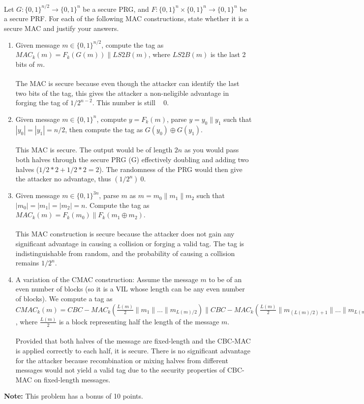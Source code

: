 \documentclass[12pt]{article}
\newcommand{\zo}{\{0,1\}}
\newcommand*\concat{\mathbin{\|}}
\begin{document}
\vspace{12pt}
Let $G:\zo^{n/2} \to \zo^{n}$ be a secure PRG, and $F:\zo^n \times \zo^n \to \zo^n$ be a secure PRF. For each of the following MAC constructions, state whether it is a secure MAC and justify your answers.
\begin{enumerate}
\item Given message $m \in \zo^{n/2}$, compute the tag as $MAC_k(m) = F_k(G(m)) \concat LS2B(m)$, where $LS2B(m)$ is the last 2 bits of $m$.
\\\\The MAC is secure because even though the attacker can identify the last two bits of the tag, this gives the attacker a non-neligible advantage in forging the tag of \(1/2^{n-2}\). This number is still ~ 0.
\item Given message $m \in \zo^{n}$, compute $y = F_k(m)$, parse $y = y_0 \concat y_1$ such that $|y_0| = |y_1| = n/2$, then compute the tag as $G(y_0)\oplus G(y_1)$.
\\\\This MAC is secure. The output would be of length $2n$ as you would pass both halves through the secure PRG (G) effectively doubling and adding two halves ($1/2*2 + 1/2*2 = 2$). The randomness of the PRG would then give the attacker no advantage, thus $(1/2^n) ~ 0$. 
\item Given message $m \in \zo^{3n}$, parse $m$ as $m = m_0 \concat m_1 \concat m_2$ such that $|m_0| = |m_1| = |m_2| = n$. Compute the tag as $MAC_k(m) = F_k(m_0) \concat F_k(m_1 \oplus m_2)$.
\\\\This MAC construction is secure because the attacker does not gain any significant advantage in causing a collision or forging a valid tag. The tag is indistinguishable from random, and the probability of causing a collision remains \(1/2^n\).
\item A variation of the CMAC construction: Assume the message $m$ to be of an even number of blocks (so it is a VIL whose length can be any even number of blocks). We compute a tag as $CMAC_k(m) = CBC-MAC_k(\frac{L(m)}{2} \concat m_1 \concat \dots \concat m_{L(m)/2}) \concat CBC-MAC_k(\frac{L(m)}{2} \concat m_{(L(m)/2) + 1} \concat \dots \concat m_{L(m)})$, where $\frac{L(m)}{2}$ is a block representing half the length of the message $m$.
\\\\Provided that both halves of the message are fixed-length and the CBC-MAC is applied correctly to each half, it is secure. There is no significant advantage for the attacker because recombination or mixing halves from different messages would not yield a valid tag due to the security properties of CBC-MAC on fixed-length messages.
\end{enumerate} 

\noindent\textbf{Note:} This problem has a bonus of 10 points.
\end{document}
